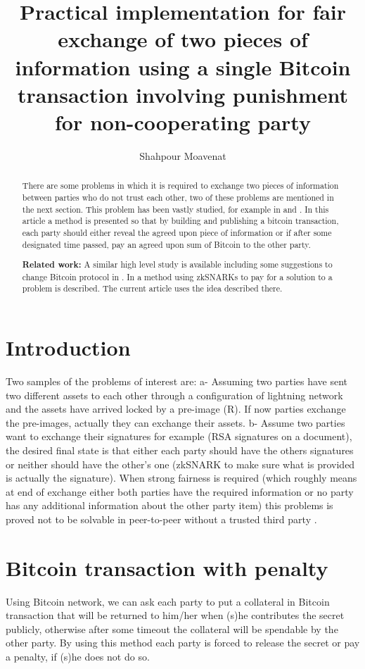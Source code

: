 \documentclass[]{article}
\title{Practical implementation for fair exchange of two pieces of information using a single Bitcoin transaction involving punishment for non-cooperating party}
\author{Shahpour Moavenat}
\affil{Lykke Corp}
\begin{document}
\maketitle

\begin{abstract}
There are some problems in which it is required to exchange two pieces of information between parties who do not trust each other, two of these problems are mentioned in the next section. This problem has been vastly studied, for example in \cite{ray2002} and \cite{asokan99}. In this article a method is presented so that by building and publishing a bitcoin transaction, each party should either reveal the agreed upon piece of information or if after some designated time passed, pay an agreed upon sum of Bitcoin to the other party.

\textbf{Related work:} A similar high level study is available including some suggestions to change Bitcoin protocol in \cite{andrychowicz}. In \cite{maxwell2016} a method using zkSNARKs\cite{ethzkSNARK} to pay for a solution to a problem is described. The current article uses the idea described there.
\end{abstract}

\section{Introduction}
Two samples of the problems of interest are: a- Assuming two parties have sent two different assets to each other through a configuration of lightning network \cite{lightning} and the assets have arrived locked by a pre-image (R). If now parties exchange the pre-images, actually they can exchange their assets. b- Assume two parties want to exchange their signatures for example (RSA signatures on a document), the desired final state is that either each party should have the others signatures or neither should have the other's one (zkSNARK to make sure what is provided is actually the signature). When strong fairness is required (which roughly means at end of exchange either both parties have the required information or no party has any additional information about the other party item) this problems is proved not to be solvable in peer-to-peer without a trusted third party \cite{impossible}.

\section{Bitcoin transaction with penalty}
Using Bitcoin network, we can ask each party to put a collateral in Bitcoin transaction that will be returned to him/her when (s)he contributes the secret publicly, otherwise after some timeout the collateral will be spendable by the other party. By using this method each party is forced to release the secret or pay a penalty, if (s)he does not do so.
\end{document}
